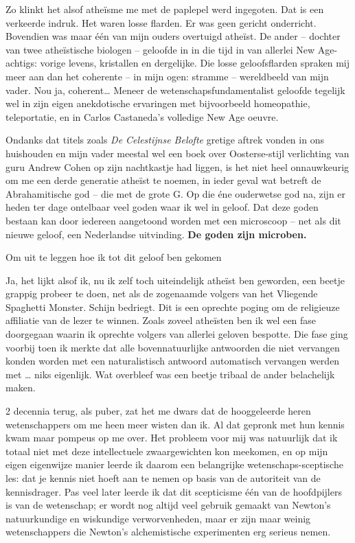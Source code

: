 \documentclass[12pt,a4paper]{article}
\begin{document}
Zo klinkt het alsof atheïsme me met de paplepel werd ingegoten. Dat is een verkeerde indruk. Het waren losse flarden. Er was geen gericht onderricht. Bovendien was maar één van mijn ouders overtuigd atheïst. De ander – dochter van twee atheïstische biologen – geloofde in in die tijd in van allerlei New Age-achtigs: vorige levens, kristallen en dergelijke. Die losse geloofsflarden spraken mij meer aan dan het coherente – in mijn ogen: stramme – wereldbeeld van mijn vader. Nou ja, coherent… Meneer de wetenschapsfundamentalist geloofde tegelijk wel in zijn eigen anekdotische ervaringen met bijvoorbeeld homeopathie, teleportatie, en in Carlos Castaneda's volledige New Age oeuvre.

Ondanks dat titels zoals \emph{De Celestijnse Belofte} gretige aftrek vonden in ons huishouden en mijn vader meestal wel een boek over Oosterse-stijl verlichting van guru Andrew Cohen op zijn nachtkastje had liggen, is het niet heel onnauwkeurig om me een derde generatie atheïst te noemen, in ieder geval wat betreft de Abrahamitische god – die met de grote G. Op die éne ouderwetse god na, zijn er heden ter dage ontelbaar veel goden waar ik wel in geloof. Dat deze goden bestaan kan door iedereen aangetoond worden met een microscoop – net als dit nieuwe geloof, een Nederlandse uitvinding. \textbf{De goden zijn microben.}

Om uit te leggen hoe ik tot dit geloof ben gekomen


Ja, het lijkt alsof ik, nu ik zelf toch uiteindelijk atheïst ben geworden, een beetje grappig probeer te doen, net als de zogenaamde volgers van het Vliegende Spaghetti Monster. Schijn bedriegt. Dit is een oprechte poging om de religieuze affiliatie van de lezer te winnen. Zoals zoveel atheïsten ben ik wel een fase doorgegaan waarin ik oprechte volgers van allerlei geloven bespotte. Die fase ging voorbij toen ik merkte dat alle bovennatuurlijke antwoorden die niet vervangen konden worden met een naturalistisch antwoord automatisch vervangen werden met … niks eigenlijk. Wat overbleef was een beetje tribaal de ander belachelijk maken.

2 decennia terug, als puber, zat het me dwars dat de hooggeleerde heren wetenschappers om me heen meer wisten dan ik. Al dat gepronk met hun kennis kwam maar pompeus op me over. Het probleem voor mij was natuurlijk dat ik totaal niet met deze intellectuele zwaargewichten kon meekomen, en op mijn eigen eigenwijze manier leerde ik daarom een belangrijke wetenschaps-sceptische les: dat je kennis niet hoeft aan te nemen op basis van de autoriteit van de kennisdrager. Pas veel later leerde ik dat dit scepticisme één van de hoofdpijlers is van de wetenschap; er wordt nog altijd veel gebruik gemaakt van Newton's natuurkundige en wiskundige verworvenheden, maar er zijn maar weinig wetenschappers die Newton's alchemistische experimenten erg serieus nemen.
\end{document}
